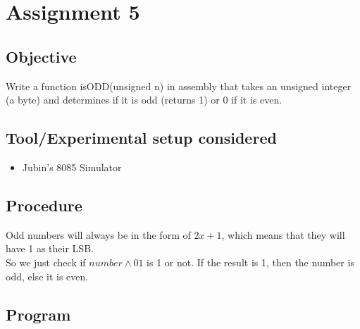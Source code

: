 \documentclass[a4paper]{article} %
\begin{document}
\section[Check if number odd]{Assignment 5} %
\subsection{Objective}
Write a function isODD(unsigned n) in assembly that takes an unsigned integer (a byte) and determines if it is odd (returns 1) or 0 if it is even.
\subsection{Tool/Experimental setup considered}
\begin{itemize}
    \item Jubin's 8085 Simulator
\end{itemize}
\subsection{Procedure}
Odd numbers will always be in the form of $2x + 1$, which means that they will have 1 as their LSB.\\
So we just check if $number \land 01$ is 1 or not. If the result is 1, then the number is odd, else it is even.
\subsection{Program}

\end{document}
